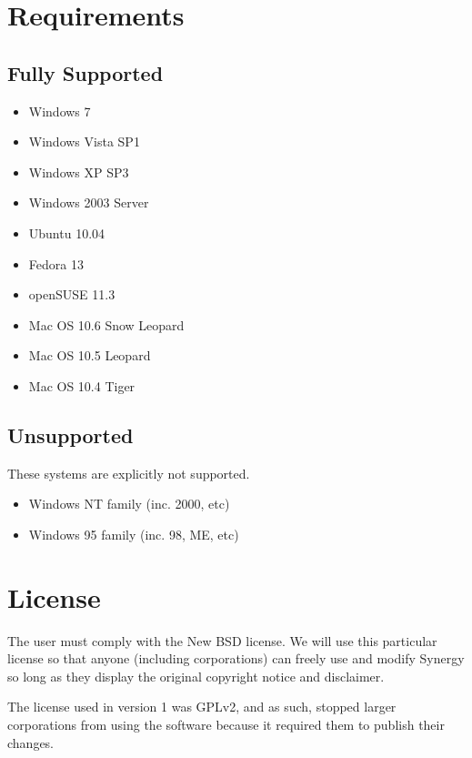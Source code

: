 \section{Requirements}

\subsection{Fully Supported}

\begin{itemize}
  \item Windows 7
  \item Windows Vista SP1
  \item Windows XP SP3
  \item Windows 2003 Server
  \item Ubuntu 10.04
  \item Fedora 13
  \item openSUSE 11.3
  \item Mac OS 10.6 Snow Leopard
  \item Mac OS 10.5 Leopard
  \item Mac OS 10.4 Tiger
\end{itemize}

\subsection{Unsupported}

These systems are explicitly not supported.

\begin{itemize}
  \item Windows NT family (inc. 2000, etc)
  \item Windows 95 family (inc. 98, ME, etc)
\end{itemize}

\section*{License}

The user must comply with the New BSD license. We will use this particular 
license so that anyone (including corporations) can freely use and modify 
Synergy so long as they display the original copyright notice and disclaimer.

The license used in version 1 was GPLv2, and as such, stopped larger 
corporations from using the software because it required them to publish
their changes.
